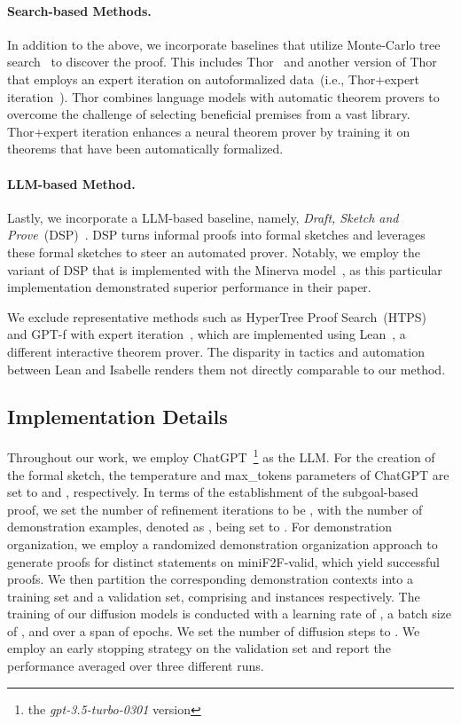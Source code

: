\documentclass{article}
\begin{document}
\paragraph{Search-based Methods.}

In addition to the above, we incorporate baselines that utilize Monte-Carlo tree search~\cite{silver2016mastering} to discover the proof. This includes Thor~\cite{jiang2022thor} and another version of Thor that employs an expert iteration on autoformalized data~(i.e., Thor+expert iteration~\cite{wu2022autoformalization}). Thor combines language models with automatic theorem provers to overcome the challenge of selecting beneficial premises from a vast library. Thor+expert iteration enhances a neural theorem prover by training it on theorems that have been automatically formalized.



\paragraph{LLM-based Method.}

Lastly, we incorporate a LLM-based baseline, namely, \emph{Draft, Sketch and Prove}~(DSP)~\cite{jiang2022draft}. DSP turns informal proofs into formal sketches and leverages these formal sketches to steer an automated prover. Notably, we employ the variant of DSP that is implemented with the  Minerva model~\cite{lewkowycz2022solving}, as this particular implementation demonstrated superior performance in their paper.

We exclude representative methods such as HyperTree Proof Search~(HTPS)~\cite{lample2022hypertree} and GPT-f with expert iteration~\cite{polu2022formal}, which are implemented using Lean~\cite{de2015lean}, a different interactive theorem prover. The disparity in tactics and automation between Lean and Isabelle renders them not directly comparable to our method.

\subsection{Implementation Details}
Throughout our work, we employ ChatGPT~\footnote{the \textit{gpt-3.5-turbo-0301} version} as the LLM. For the creation of the formal sketch, the temperature and max\_tokens
parameters of ChatGPT are set to  and , respectively. 
In terms of the establishment of the subgoal-based proof, we set the number of refinement iterations to be , with the number of demonstration examples, denoted as , being set to .
For demonstration organization, we employ a randomized demonstration organization approach to generate proofs for  distinct statements on miniF2F-valid, which yield  successful proofs. We then partition the corresponding demonstration contexts into a training set and a validation set, comprising  and  instances respectively. The training of our diffusion models is conducted with a learning rate of , a batch size of , and over a span of  epochs.
We set the number of diffusion steps  to . We employ an early stopping strategy on the validation set and report the performance averaged over three different runs.
\end{document}
